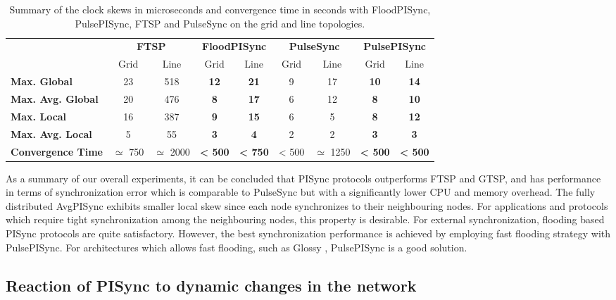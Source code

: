 \documentclass[english,a4paper,10pt,final]{article}
\numberwithin{equation}{section}
\numberwithin{figure}{section}
\begin{document}
\begin{table}

\center

\caption{Summary of the clock skews in microseconds and convergence time in seconds with FloodPISync, PulsePISync, FTSP and PulseSync on the grid and line topologies. \label{table:ftsp-pulsesync-pi}}

\begin{tabular}{lcccc||cccc}
\multicolumn{1}{l}{} & \multicolumn{2}{c}{\textbf{FTSP}} & \multicolumn{2}{c}{\textbf{FloodPISync}} & \multicolumn{2}{c}{\textbf{PulseSync}} & \multicolumn{2}{c}{\textbf{PulsePISync}} \tabularnewline
\multicolumn{1}{l}{}      & Grid & Line & Grid & Line & Grid & Line & Grid & Line \\
\textbf{Max. Global}       &  23  &  518  &  \bf 12  & \bf 21  & { 9} & { 17} & { \bf 10} & { \bf 14} \\ 
\textbf{Max. Avg. Global } &  20   & 476  & \bf 8   & \bf 17  & { 6} & { 12} & { \bf 8} & { \bf 10} \\ 
\textbf{Max. Local }       &  16   & 387  & \bf 9  & \bf 15   & { 6} & { 5}  & { \bf 8} & { \bf 12} \\ 
\textbf{Max. Avg. Local }  &  5   & 55   &  \bf 3   & \bf 4   & { 2}  & { 2}  & { \bf  3} & { \bf 3} \\ 
\textbf{Convergence Time}  & $  \simeq$ 750  &  $\simeq$ 2000 & { \bf < 500} & { \bf < 750} & { < 500}  & { $\simeq$ 1250}  & { \bf < 500} & { \bf < 500} \\ 
\end{tabular}
\end{table}

As a summary of our overall experiments, it can be concluded that PISync protocols outperforms FTSP and GTSP, and has performance in terms of synchronization error which is comparable to PulseSync but with a significantly lower CPU and memory overhead. The fully distributed AvgPISync exhibits smaller local skew since each node synchronizes to their neighbouring nodes. For applications and protocols which require tight synchronization among the neighbouring nodes, this property is desirable. For external synchronization, flooding based PISync protocols are quite satisfactory. However, the best synchronization performance is achieved by employing fast flooding strategy with PulsePISync. For architectures which allows fast flooding, such as Glossy \cite{ferrari2011efficient}, PulsePISync is a good solution. 

\subsection{Reaction of PISync to dynamic changes in the network}
\end{document}
